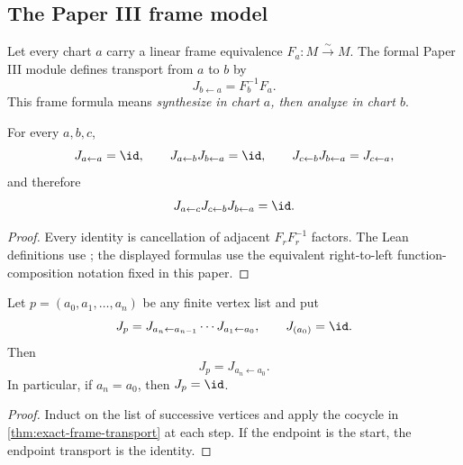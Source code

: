 \subsection{The Paper III frame model}

Let every chart $a$ carry a linear frame equivalence
$F_a:M\xrightarrow{\sim}M$.  The formal Paper III module defines transport
from $a$ to $b$ by
\[
J_{b\leftarrow a}=F_b^{-1}F_a.
\]
This frame formula means \emph{synthesize in chart \(a\), then
analyze in chart \(b\)}.

\begin{theorem}
\label{thm:exact-frame-transport}
For every $a,b,c$,
\[
J_{a\leftarrow a}=\id,\qquad
J_{a\leftarrow b}J_{b\leftarrow a}=\id,\qquad
J_{c\leftarrow b}J_{b\leftarrow a}=J_{c\leftarrow a},
\]
and therefore
\[
J_{a\leftarrow c}J_{c\leftarrow b}J_{b\leftarrow a}=\id.
\]
\end{theorem}

\begin{proof}
Every identity is cancellation of adjacent $F_rF_r^{-1}$ factors.  The Lean
definitions use ; the displayed formulas use the
equivalent right-to-left function-composition notation fixed in this paper.
\end{proof}

\begin{theorem}
\label{thm:exact-path-transport}
Let $p=(a_0,a_1,\ldots,a_n)$ be any finite vertex list and put
\[
J_p
=J_{a_n\leftarrow a_{n-1}}\cdots J_{a_1\leftarrow a_0},
\qquad
J_{(a_0)}=\id.
\]
Then
\[
J_p=J_{a_n\leftarrow a_0}.
\]
In particular, if $a_n=a_0$, then $J_p=\id$.
\end{theorem}

\begin{proof}
Induct on the list of successive vertices and apply the cocycle in
\cref{thm:exact-frame-transport} at each step.  If the endpoint is the start,
the endpoint transport is the identity.
\end{proof}

